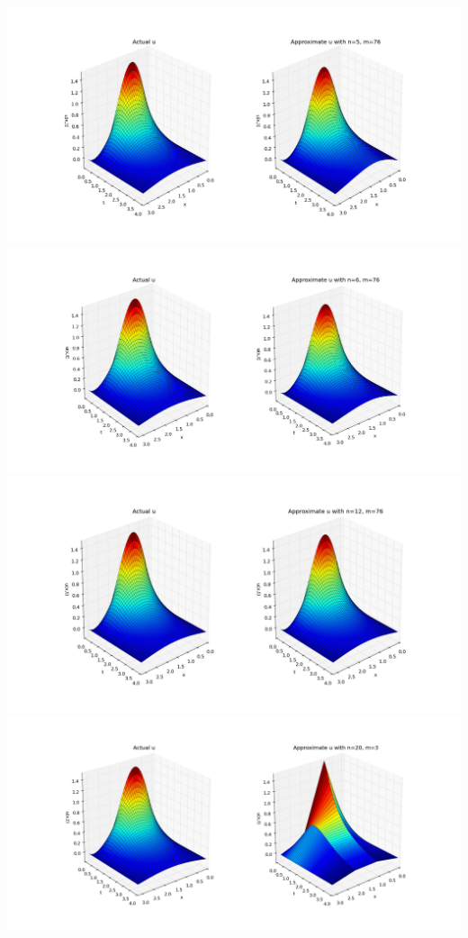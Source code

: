 \documentclass[letterpaper, 12pt]{article}
\begin{document}
	\includegraphics[trim = 6.5cm 3cm 6cm 2cm, width=\linewidth]{ProjectFiles/results/plots/n5m76.png} \\\vspace{2cm}
	\includegraphics[trim = 6.5cm 3cm 6cm 2cm, width=\linewidth]{ProjectFiles/results/plots/n6m76.png} \\\vspace{2cm}
	\includegraphics[trim = 6.5cm 3cm 6cm 2cm, width=\linewidth]{ProjectFiles/results/plots/n12m76.png} \\\vspace{2cm}
	\includegraphics[trim = 6.5cm 3cm 6cm 2cm, width=\linewidth]{ProjectFiles/results/plots/n20m3.png} \\\vspace{2cm}
\end{document}
